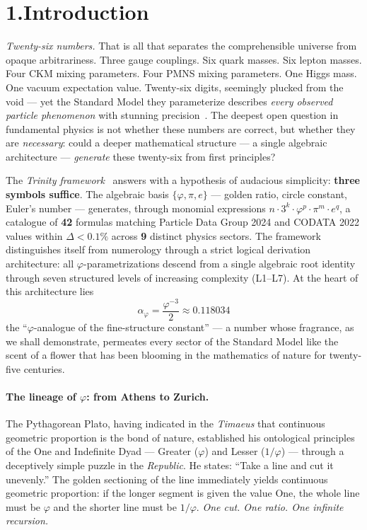 \documentclass[10pt,a4paper]{article}
\begin{document}
\section*{1.\quad Introduction}

\textit{Twenty-six numbers.}
That is all that separates the comprehensible universe from opaque arbitrariness.
Three gauge couplings. Six quark masses. Six lepton masses.
Four CKM mixing parameters. Four PMNS mixing parameters.
One Higgs mass. One vacuum expectation value.
Twenty-six digits, seemingly plucked from the void --- yet the Standard Model
they parameterize describes \emph{every observed particle phenomenon} with
stunning precision~\cite{PDG2024}.
The deepest open question in fundamental physics is not whether these numbers
are correct, but whether they are \emph{necessary}:
could a deeper mathematical structure --- a single algebraic architecture ---
\emph{generate} these twenty-six from first principles?

The \textit{Trinity framework}~\cite{trinity2024} answers with a hypothesis
of audacious simplicity: \textbf{three symbols suffice}.
The algebraic basis $\{\varphi, \pi, e\}$ --- golden ratio, circle constant,
Euler's number --- generates, through monomial expressions
$n \cdot 3^k \cdot \varphi^p \cdot \pi^m \cdot e^q$,
a catalogue of \textbf{42} formulas matching Particle Data Group 2024
and CODATA 2022 values within $\Delta < 0.1\%$ across \textbf{9} distinct
physics sectors. The framework distinguishes itself from numerology through
a strict logical derivation architecture: all $\varphi$-parametrizations
descend from a single algebraic root identity through seven structured levels
of increasing complexity (L1--L7). At the heart of this architecture lies
\[
  \alpha_\varphi = \frac{\varphi^{-3}}{2} \approx 0.118034
  \]
the ``$\varphi$-analogue of the fine-structure constant'' --- a number
whose fragrance, as we shall demonstrate, permeates every sector of the
Standard Model like the scent of a flower that has been blooming in the
mathematics of nature for twenty-five centuries.

\paragraph{The lineage of $\varphi$: from Athens to Zurich.}
The Pythagorean Plato, having indicated in the \textit{Timaeus} that
continuous geometric proportion is the bond of nature, established his
ontological principles of the One and Indefinite Dyad --- Greater ($\varphi$)
and Lesser ($1/\varphi$) --- through a deceptively simple puzzle in the
\textit{Republic}. He states: ``Take a line and cut it unevenly.''
The golden sectioning of the line immediately yields continuous geometric
proportion: if the longer segment is given the value One, the whole line
must be $\varphi$ and the shorter line must be $1/\varphi$.
\textit{One cut. One ratio. One infinite recursion.}
\end{document}
